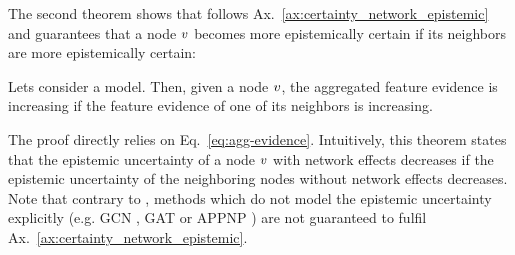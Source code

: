 The second theorem shows that \GPNacro{} follows Ax.~\ref{ax:certainty_network_epistemic} and guarantees that a node $v$ becomes more epistemically certain if its neighbors are more epistemically certain:
\begin{theorem}
\label{thm:axiom-network-epistemic}
Lets consider a \GPNacro{} model. Then, given a node $v$, the aggregated feature evidence  is increasing if the feature evidence  of one of its neighbors \smash{$\nodeu \in \neighbors(\nodev)$} is increasing.
\end{theorem}
The proof directly relies on Eq.~\ref{eq:agg-evidence}. Intuitively, this theorem states that the epistemic uncertainty  of a node $v$ with network effects decreases if the epistemic uncertainty of the neighboring nodes without network effects decreases. Note that contrary to \GPNacro{}, methods which do not model the epistemic uncertainty explicitly (e.g. GCN \cite{Kipf2016}, GAT \citep{Velickovic2017} or APPNP \citep{Klicpera2018}) are not guaranteed to fulfil Ax.~\ref{ax:certainty_network_epistemic}. 

